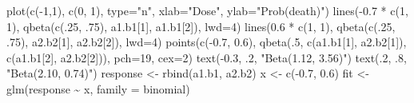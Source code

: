 \documentclass[
]{book}
\newenvironment{Shaded}{\begin{snugshade}}{\end{snugshade}}
\newcommand{\AttributeTok}[1]{\textcolor[rgb]{0.77,0.63,0.00}{#1}}
\newcommand{\DecValTok}[1]{\textcolor[rgb]{0.00,0.00,0.81}{#1}}
\newcommand{\FloatTok}[1]{\textcolor[rgb]{0.00,0.00,0.81}{#1}}
\newcommand{\FunctionTok}[1]{\textcolor[rgb]{0.00,0.00,0.00}{#1}}
\newcommand{\NormalTok}[1]{#1}
\newcommand{\OtherTok}[1]{\textcolor[rgb]{0.56,0.35,0.01}{#1}}
\newcommand{\SpecialCharTok}[1]{\textcolor[rgb]{0.00,0.00,0.00}{#1}}
\newcommand{\StringTok}[1]{\textcolor[rgb]{0.31,0.60,0.02}{#1}}
\begin{document}
\begin{Shaded}
\begin{Highlighting}[]
\FunctionTok{plot}\NormalTok{(}\FunctionTok{c}\NormalTok{(}\SpecialCharTok{{-}}\DecValTok{1}\NormalTok{,}\DecValTok{1}\NormalTok{), }\FunctionTok{c}\NormalTok{(}\DecValTok{0}\NormalTok{, }\DecValTok{1}\NormalTok{), }\AttributeTok{type=}\StringTok{"n"}\NormalTok{, }
     \AttributeTok{xlab=}\StringTok{"Dose"}\NormalTok{, }\AttributeTok{ylab=}\StringTok{"Prob(death)"}\NormalTok{)}
\FunctionTok{lines}\NormalTok{(}\SpecialCharTok{{-}}\FloatTok{0.7} \SpecialCharTok{*} \FunctionTok{c}\NormalTok{(}\DecValTok{1}\NormalTok{, }\DecValTok{1}\NormalTok{), }\FunctionTok{qbeta}\NormalTok{(}\FunctionTok{c}\NormalTok{(.}\DecValTok{25}\NormalTok{, .}\DecValTok{75}\NormalTok{), }
\NormalTok{      a1.b1[}\DecValTok{1}\NormalTok{], a1.b1[}\DecValTok{2}\NormalTok{]), }\AttributeTok{lwd=}\DecValTok{4}\NormalTok{)}
\FunctionTok{lines}\NormalTok{(}\FloatTok{0.6} \SpecialCharTok{*} \FunctionTok{c}\NormalTok{(}\DecValTok{1}\NormalTok{, }\DecValTok{1}\NormalTok{), }\FunctionTok{qbeta}\NormalTok{(}\FunctionTok{c}\NormalTok{(.}\DecValTok{25}\NormalTok{, .}\DecValTok{75}\NormalTok{), }
\NormalTok{      a2.b2[}\DecValTok{1}\NormalTok{], a2.b2[}\DecValTok{2}\NormalTok{]), }\AttributeTok{lwd=}\DecValTok{4}\NormalTok{)}
\FunctionTok{points}\NormalTok{(}\FunctionTok{c}\NormalTok{(}\SpecialCharTok{{-}}\FloatTok{0.7}\NormalTok{, }\FloatTok{0.6}\NormalTok{), }\FunctionTok{qbeta}\NormalTok{(.}\DecValTok{5}\NormalTok{, }\FunctionTok{c}\NormalTok{(a1.b1[}\DecValTok{1}\NormalTok{],}
\NormalTok{          a2.b2[}\DecValTok{1}\NormalTok{]), }\FunctionTok{c}\NormalTok{(a1.b1[}\DecValTok{2}\NormalTok{], a2.b2[}\DecValTok{2}\NormalTok{])),}
         \AttributeTok{pch=}\DecValTok{19}\NormalTok{, }\AttributeTok{cex=}\DecValTok{2}\NormalTok{)}
\FunctionTok{text}\NormalTok{(}\SpecialCharTok{{-}}\FloatTok{0.3}\NormalTok{, .}\DecValTok{2}\NormalTok{, }\StringTok{"Beta(1.12, 3.56)"}\NormalTok{)}
\FunctionTok{text}\NormalTok{(.}\DecValTok{2}\NormalTok{, .}\DecValTok{8}\NormalTok{, }\StringTok{"Beta(2.10, 0.74)"}\NormalTok{)}
\NormalTok{response }\OtherTok{\textless{}{-}} \FunctionTok{rbind}\NormalTok{(a1.b1, a2.b2)}
\NormalTok{x }\OtherTok{\textless{}{-}} \FunctionTok{c}\NormalTok{(}\SpecialCharTok{{-}}\FloatTok{0.7}\NormalTok{, }\FloatTok{0.6}\NormalTok{)}
\NormalTok{fit }\OtherTok{\textless{}{-}} \FunctionTok{glm}\NormalTok{(response }\SpecialCharTok{\textasciitilde{}}\NormalTok{ x, }\AttributeTok{family =}\NormalTok{ binomial)}
\end{Highlighting}
\end{Shaded}
\end{document}
